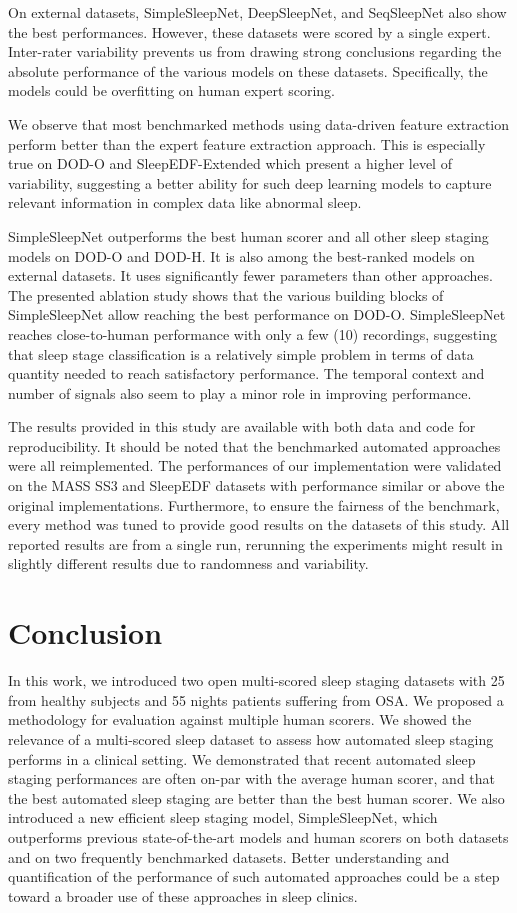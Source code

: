 \documentclass[journal]{IEEEtran}
\begin{document}
On external datasets, SimpleSleepNet, DeepSleepNet, and SeqSleepNet also show the best performances. However, these datasets were scored by a single expert. Inter-rater variability prevents us from drawing strong conclusions regarding the absolute performance of the various models on these datasets. Specifically, the models could be overfitting on human expert scoring.

We observe that most benchmarked methods using data-driven feature extraction perform better than the expert feature extraction approach. This is especially true on DOD-O and SleepEDF-Extended which present a higher level of variability, suggesting a better ability for such deep learning models to capture relevant information in complex data like abnormal sleep.

SimpleSleepNet outperforms the best human scorer and all other sleep staging models on DOD-O and DOD-H. It is also among the best-ranked models on external datasets. It uses significantly fewer parameters than other approaches. The presented ablation study shows that the various building blocks of SimpleSleepNet allow reaching the best performance on DOD-O. SimpleSleepNet reaches close-to-human performance with only a few (10) recordings, suggesting that sleep stage classification is a relatively simple problem in terms of data quantity needed to reach satisfactory performance. The temporal context and number of signals also seem to play a minor role in improving performance.

The results provided in this study are available with both data and code for reproducibility. It should be noted that the benchmarked automated approaches were all reimplemented. The performances of our implementation were validated on the MASS SS3 and SleepEDF datasets with performance similar or above the original implementations.
Furthermore, to ensure the fairness of the benchmark, every method was tuned to provide good results on the datasets of this study. All reported results are from a single run, rerunning the experiments might result in slightly different results due to randomness and variability. 
\section{Conclusion}
In this work, we introduced two open multi-scored sleep staging datasets with 25 from healthy subjects and 55 nights patients suffering from OSA. We proposed a methodology for evaluation against multiple human scorers. We showed the relevance of a multi-scored sleep dataset to assess how automated sleep staging performs in a clinical setting. We demonstrated that recent automated sleep staging performances are often on-par with the average human scorer, and that the best automated sleep staging are better than the best human scorer. We also introduced a new efficient sleep staging model, SimpleSleepNet, which outperforms previous state-of-the-art models and human scorers on both datasets and on two frequently benchmarked datasets. Better understanding and quantification of the performance of such automated approaches could be a step toward a broader use of these approaches in sleep clinics.
\end{document}
